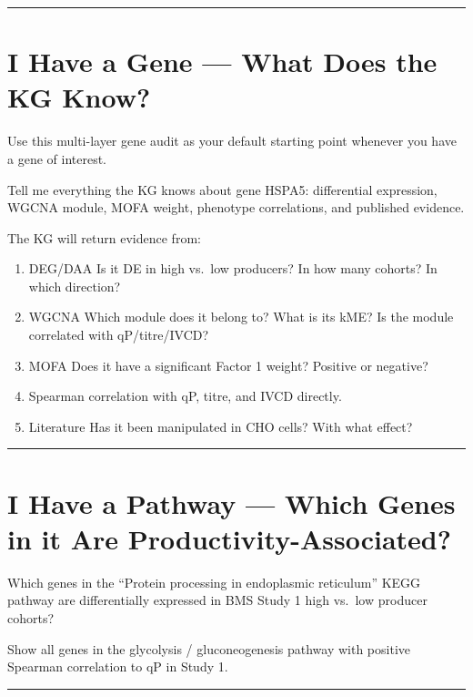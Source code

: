 \documentclass[
  letterpaper,
  oneside,
  open=any]{scrbook}
\providecommand{\tightlist}{%
  \setlength{\itemsep}{0pt}\setlength{\parskip}{0pt}}
\begin{document}
\begin{center}\rule{0.5\linewidth}{0.5pt}\end{center}

\section{I Have a Gene --- What Does the KG
Know?}\label{i-have-a-gene-what-does-the-kg-know}

Use this multi-layer gene audit as your default starting point whenever
you have a gene of interest.

Tell me everything the KG knows about gene HSPA5: differential
expression, WGCNA module, MOFA weight, phenotype correlations, and
published evidence.

The KG will return evidence from:

\begin{enumerate}
\def\labelenumi{\arabic{enumi}.}
\tightlist
\item
  {DEG/DAA} Is it DE in high vs.~low producers? In how many cohorts? In
  which direction?
\item
  {WGCNA} Which module does it belong to? What is its kME? Is the module
  correlated with qP/titre/IVCD?
\item
  {MOFA} Does it have a significant Factor 1 weight? Positive or
  negative?
\item
  Spearman correlation with qP, titre, and IVCD directly.
\item
  {Literature} Has it been manipulated in CHO cells? With what effect?
\end{enumerate}

\begin{center}\rule{0.5\linewidth}{0.5pt}\end{center}

\section{I Have a Pathway --- Which Genes in it Are
Productivity-Associated?}\label{i-have-a-pathway-which-genes-in-it-are-productivity-associated}

Which genes in the ``Protein processing in endoplasmic reticulum'' KEGG
pathway are differentially expressed in BMS Study 1 high vs.~low
producer cohorts?

Show all genes in the glycolysis / gluconeogenesis pathway with positive
Spearman correlation to qP in Study 1.

\begin{center}\rule{0.5\linewidth}{0.5pt}\end{center}
\end{document}
